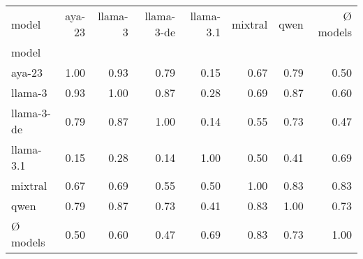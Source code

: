 \begin{tabular}{lrrrrrrr}
\toprule
model & aya-23 & llama-3 & llama-3-de & llama-3.1 & mixtral & qwen & Ø models \\
model &  &  &  &  &  &  &  \\
\midrule
aya-23 & 1.00 & 0.93 & 0.79 & 0.15 & 0.67 & 0.79 & 0.50 \\
llama-3 & 0.93 & 1.00 & 0.87 & 0.28 & 0.69 & 0.87 & 0.60 \\
llama-3-de & 0.79 & 0.87 & 1.00 & 0.14 & 0.55 & 0.73 & 0.47 \\
llama-3.1 & 0.15 & 0.28 & 0.14 & 1.00 & 0.50 & 0.41 & 0.69 \\
mixtral & 0.67 & 0.69 & 0.55 & 0.50 & 1.00 & 0.83 & 0.83 \\
qwen & 0.79 & 0.87 & 0.73 & 0.41 & 0.83 & 1.00 & 0.73 \\
Ø models & 0.50 & 0.60 & 0.47 & 0.69 & 0.83 & 0.73 & 1.00 \\
\bottomrule
\end{tabular}
